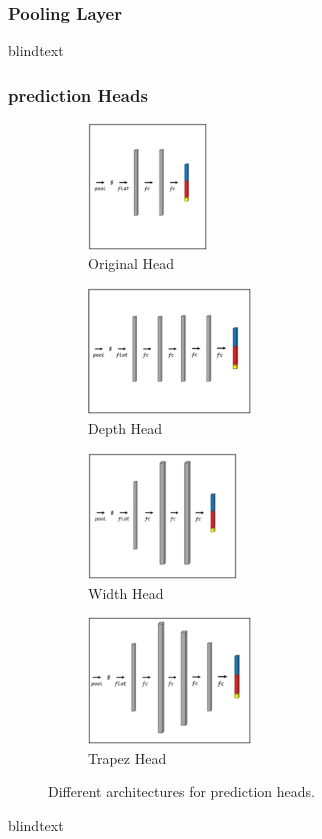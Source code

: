 \subsubsection{Pooling Layer}

blindtext

\subsubsection{prediction Heads}

\begin{figure}[H]
    \centering
    \begin{subfigure}[t]{0.2\textwidth}
        \centering
        \includegraphics[height=3.35cm, keepaspectratio]{PICs/improvedModel/originalHead.jpg}
        \caption{Original Head \cite{tepNet2024}}
    \end{subfigure}
    \begin{subfigure}[t]{0.3\textwidth}
        \centering
        \includegraphics[height=3.35cm, keepaspectratio]{PICs/improvedModel/depthHead.jpg}
        \caption{Depth Head}
    \end{subfigure}
    \begin{subfigure}[t]{0.25\textwidth}
        \centering
        \includegraphics[height=3.35cm, keepaspectratio]{PICs/improvedModel/widthHead.jpg}
        \caption{Width Head}
    \end{subfigure}
    \begin{subfigure}[t]{0.3\textwidth}
        \centering
        \includegraphics[height=3.35cm, keepaspectratio]{PICs/improvedModel/trapezHead.jpg}
        \caption{Trapez Head}
    \end{subfigure}
    \caption{Different architectures for prediction heads.}
\end{figure}

blindtext

